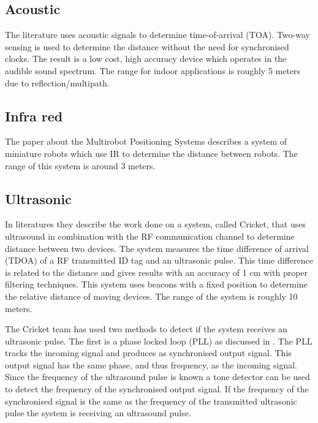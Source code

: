 \subsection*{Acoustic}

The literature \cite{Peng2007} uses acoustic signals to determine time-of-arrival (TOA). Two-way sensing is used to determine the distance without the need for synchronised clocks. The result is a low cost, high accuracy device which operates in the audible sound spectrum. The range for indoor applications is roughly 5 meters due to reflection/multipath.

\subsection*{Infra red}

The paper about the Multirobot Positioning Systems \cite{Pugh2009} describes a system of miniature robots which use IR to determine the distance between robots. The range of this system is around 3 meters.

\subsection*{Ultrasonic}
In literatures \cite{Priyantha2000,Priyantha2005,Balakrishnan2003,Smith2005} they describe the work done on a system, called Cricket, that uses ultrasound in combination with the RF communication channel to determine distance between two devices.
The system measures the time difference of arrival (TDOA) of a RF transmitted ID tag and an ultrasonic pulse.
This time difference is related to the distance and gives results with an accuracy of 1 cm with proper filtering techniques. This system uses beacons with a fixed position to determine the relative distance of moving devices.
The range of the system is roughly 10 meters.

The Cricket team has used two methods to detect if the system receives an ultrasonic pulse. The first is a phase locked loop (PLL) as discussed in \cite{Hsieh1996}.
The PLL tracks the incoming signal and produces as synchronised output signal.
This output signal has the same phase, and thus frequency, as the incoming signal.
Since the frequency of the ultrasound pulse is known a tone detector can be used to detect the frequency of the synchronised output signal.
If the frequency of the synchronised signal is the same as the frequency of the transmitted ultrasonic pulse the system is receiving an ultrasound pulse.

